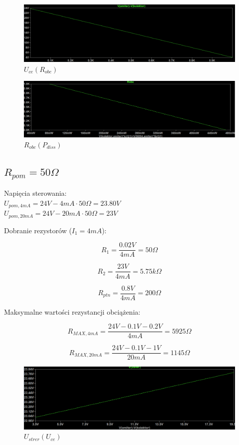 \documentclass{article}
\begin{document}
\begin{figure}[h!]
    \includegraphics[scale=0.3]{p11.png}
    \centering
    \caption{$U_{ce}(R_{obc})$}
\end{figure}

\begin{figure}[h!]
    \includegraphics[scale=0.3]{p12.png}
    \centering
    \caption{$R_{obc}(P_{diss})$}
\end{figure}



\newpage


\subsection{$R_{pom}=50\Omega$}

Napięcia sterowania:\\
$U_{pom, 4mA}=24V-4mA\cdot 50\Omega=23.80V$\\
$U_{pom, 20mA}=24V-20mA\cdot 50\Omega=23V$


Dobranie rezystorów ($I_{1}=4mA$):

$$
    R_{1}=\frac{0.02V}{4mA}=50\Omega
$$

$$
    R_{2}=\frac{23V}{4mA}=5.75k\Omega
$$

$$
    R_{ptn}=\frac{0.8V}{4mA}=200\Omega
$$


Maksymalne wartości rezystancji obciążenia:

$$
    R_{MAX, 4mA}=\frac{24V-0.1V-0.2V}{4mA}=5925\Omega
$$

$$
    R_{MAX, 20mA}=\frac{24V-0.1V-1V}{20mA}=1145\Omega
$$


\begin{figure}[h!]
    \includegraphics[scale=0.3]{p13.png}
    \centering
    \caption{$U_{strer}(U_{ce})$}
\end{figure}
\end{document}
